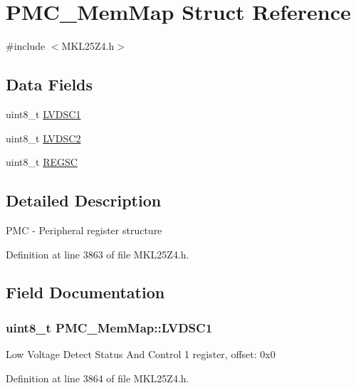 \hypertarget{struct_p_m_c___mem_map}{}\section{P\+M\+C\+\_\+\+Mem\+Map Struct Reference}
\label{struct_p_m_c___mem_map}


{\ttfamily \#include $<$M\+K\+L25\+Z4.\+h$>$}

\subsection*{Data Fields}
\begin{DoxyCompactItemize}
\item 
uint8\+\_\+t \hyperlink{struct_p_m_c___mem_map_aeed619ce4a5bf17bff6201b02deebb54}{L\+V\+D\+S\+C1}
\item 
uint8\+\_\+t \hyperlink{struct_p_m_c___mem_map_a934db8b39dae8b99a9a9165df50145f5}{L\+V\+D\+S\+C2}
\item 
uint8\+\_\+t \hyperlink{struct_p_m_c___mem_map_aa14a55a46cc237589d6c01ebf7676c2a}{R\+E\+G\+SC}
\end{DoxyCompactItemize}


\subsection{Detailed Description}
P\+MC -\/ Peripheral register structure 

Definition at line 3863 of file M\+K\+L25\+Z4.\+h.



\subsection{Field Documentation}
\subsubsection[{\texorpdfstring{L\+V\+D\+S\+C1}{LVDSC1}}]{\setlength{\rightskip}{0pt plus 5cm}uint8\+\_\+t P\+M\+C\+\_\+\+Mem\+Map\+::\+L\+V\+D\+S\+C1}\hypertarget{struct_p_m_c___mem_map_aeed619ce4a5bf17bff6201b02deebb54}{}\label{struct_p_m_c___mem_map_aeed619ce4a5bf17bff6201b02deebb54}
Low Voltage Detect Status And Control 1 register, offset\+: 0x0 

Definition at line 3864 of file M\+K\+L25\+Z4.\+h.

